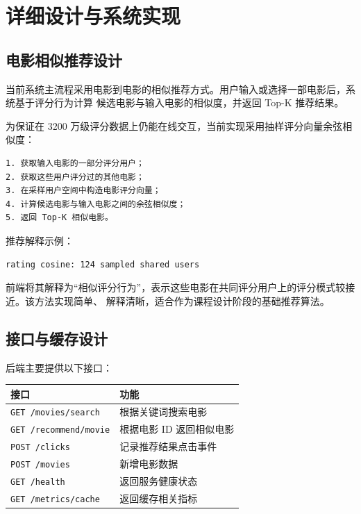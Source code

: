 \section{详细设计与系统实现}

\subsection{电影相似推荐设计}

当前系统主流程采用电影到电影的相似推荐方式。用户输入或选择一部电影后，系统基于评分行为计算
候选电影与输入电影的相似度，并返回 Top-K 推荐结果。

为保证在 3200 万级评分数据上仍能在线交互，当前实现采用抽样评分向量余弦相似度：

\begin{verbatim}
1. 获取输入电影的一部分评分用户；
2. 获取这些用户评分过的其他电影；
3. 在采样用户空间中构造电影评分向量；
4. 计算候选电影与输入电影之间的余弦相似度；
5. 返回 Top-K 相似电影。
\end{verbatim}

推荐解释示例：

\begin{verbatim}
rating cosine: 124 sampled shared users
\end{verbatim}

前端将其解释为``相似评分行为''，表示这些电影在共同评分用户上的评分模式较接近。该方法实现简单、
解释清晰，适合作为课程设计阶段的基础推荐算法。

\subsection{接口与缓存设计}

后端主要提供以下接口：

\begin{center}
\begin{tabular}{ll}
\toprule
\textbf{接口} & \textbf{功能} \\
\midrule
\texttt{GET /movies/search} & 根据关键词搜索电影 \\
\texttt{GET /recommend/movie} & 根据电影 ID 返回相似电影 \\
\texttt{POST /clicks} & 记录推荐结果点击事件 \\
\texttt{POST /movies} & 新增电影数据 \\
\texttt{GET /health} & 返回服务健康状态 \\
\texttt{GET /metrics/cache} & 返回缓存相关指标 \\
\bottomrule
\end{tabular}
\end{center}

